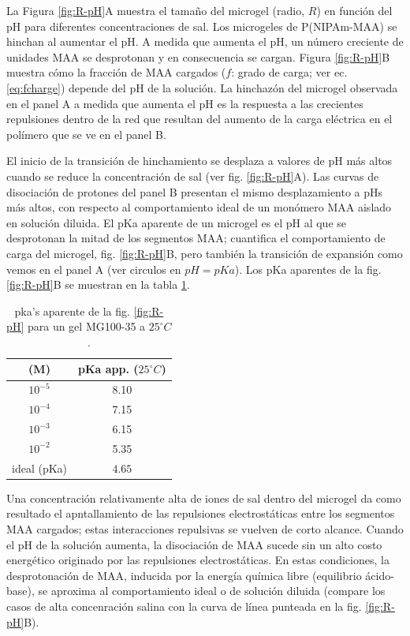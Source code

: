 La Figura \ref{fig:R-pH}A muestra el tama\~no del microgel (radio, $R$) en funci\'on del pH para diferentes concentraciones de sal.
Los microgeles de  P(NIPAm-MAA) se hinchan al aumentar el pH.
A medida que aumenta el pH, un n\'umero creciente de unidades MAA se desprotonan y en consecuencia se cargan.
Figura \ref{fig:R-pH}B muestra c\'omo la fracci\'on de MAA cargados ($f$: grado de carga; ver ec. \ref{eq:fcharge}) depende del pH de la soluci\'on.
La hinchaz\'on del microgel observada en el panel A a medida que aumenta el pH es la respuesta a las crecientes repulsiones dentro de la red que resultan del aumento de la carga el\'ectrica en el pol\'imero que se ve en el panel B.


El inicio de la transici\'on de hinchamiento se desplaza a valores de pH m\'as altos cuando se reduce la concentraci\'on de sal (ver fig. \ref{fig:R-pH}A).
Las curvas de disociaci\'on de protones del panel B presentan el mismo desplazamiento a pHs m\'as altos, con respecto al comportamiento ideal de un mon\'omero MAA aislado en soluci\'on diluida.
El pKa aparente de un microgel es el pH al que se desprotonan la mitad de los segmentos MAA;
cuantifica el comportamiento de carga del microgel, fig. \ref{fig:R-pH}B, pero tambi\'en la transici\'on de expansi\'on como vemos en el panel A (ver circulos en $pH=pKa$).
Los pKa aparentes de la fig. \ref{fig:R-pH}B se muestran en la tabla \ref{table:pKa_app}.

\begin{table}[!htb]
\small
  \begin{tabular}{|cc|}
    \hline
      [NaCl] (M)&  pKa app. ($25 ^\circ C$)  \\
      \hline
    $10^{-5}$ & 8.10  \\
    $10^{-4}$ & 7.15 \\
    $10^{-3}$ & 6.15 \\
    $10^{-2}$ & 5.35 \\
    ideal (pKa) &  $4.65$  \\
    \hline
  \end{tabular}
 \caption{ pka's aparente de la fig. \ref{fig:R-pH} para un gel MG100-35 a $25 ^\circ C$.}
\label{table:pKa_app} 
\end{table}


Una concentraci\'on relativamente alta de iones de sal dentro del microgel da como resultado el apntallamiento de las repulsiones electrost\'aticas entre los segmentos MAA cargados; estas interacciones repulsivas se vuelven de corto alcance.
Cuando el pH de la soluci\'on aumenta, la disociación de MAA sucede sin un alto costo energ\'etico originado por las repulsiones electrost\'aticas.
En estas condiciones, la desprotonaci\'on de MAA, inducida por la energ\'ia qu\'imica libre (equilibrio \'acido-base), se aproxima al comportamiento ideal o de soluci\'on diluida (compare los casos de alta concenraci\'on salina  con la curva de l\'inea punteada en la fig. \ref{fig:R-pH}B).



